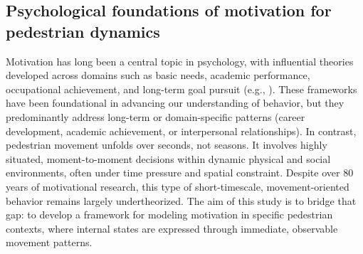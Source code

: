 \documentclass[pdflatex,sn-mathphys-num]{sn-jnl}%
\theoremstyle{thmstyleone}%
\theoremstyle{thmstyletwo}%
\theoremstyle{thmstylethree}%
\begin{document}




\subsection{Psychological foundations of motivation for pedestrian dynamics}


Motivation has long been a central topic in psychology, with influential theories developed across domains such as basic needs, academic performance, occupational achievement, and long-term goal pursuit (e.g., \cite{lewin_field_1942,atkinson_introduction_1964,vroom_work_1964}). These frameworks have been foundational in advancing our understanding of behavior, but they predominantly address long-term or domain-specific patterns (career development, academic achievement, or interpersonal relationships). In contrast, pedestrian movement unfolds over seconds, not seasons. It involves highly situated, moment-to-moment decisions within dynamic physical and social environments, often under time pressure and spatial constraint. Despite over 80 years of motivational research, this type of short-timescale, movement-oriented behavior remains largely undertheorized. The aim of this study is to bridge that gap: to develop a framework for modeling motivation in specific pedestrian contexts, where internal states are expressed through immediate, observable movement patterns.
\end{document}
